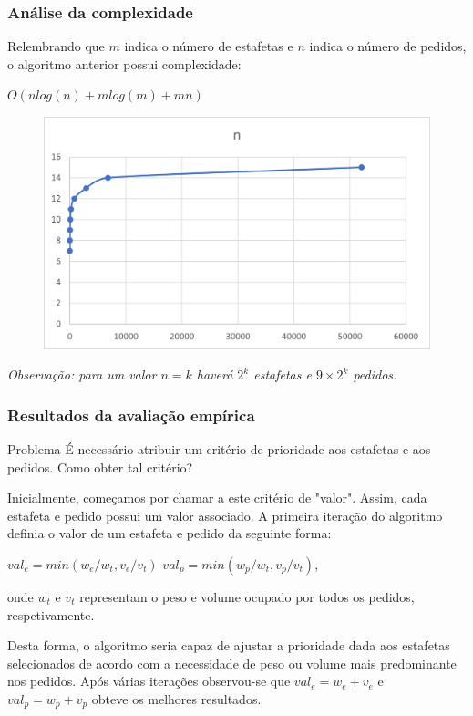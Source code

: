 \documentclass{beamer}
\begin{document}
\begin{frame}
\frametitle{Análise da complexidade}
Relembrando que $m$ indica o número de estafetas e $n$ indica o número de pedidos, o algoritmo anterior
possui complexidade:\\ 
\centerline{$O(nlog(n) + mlog(m) + mn)$}

\begin{figure}
\includegraphics[width=0.5\linewidth]{assets/scenario1.png}
\end{figure}

\textit{Observação: para um valor $n = k$ haverá $2^{k}$ estafetas e $ 9 \times 2^{k}$ pedidos.}

\end{frame}

\begin{frame}
\frametitle{Resultados da avaliação empírica}
\begin{alertblock}{Problema}
É necessário atribuir um critério de prioridade aos estafetas e aos pedidos. Como obter tal critério?
\end{alertblock}

Inicialmente, começamos por chamar a este critério de "valor". Assim, cada estafeta e pedido 
possui um valor associado.
A primeira iteração do algoritmo definia o valor de um estafeta e pedido da seguinte forma:\\
\centerline{$val_{e} = min(w_{e}/w_{t}, v_{e}/v_{t})$      $val_{p} = min(w_{p}/w_{t}, v_{p}/v_{t})$,}

onde $w_{t}$ e $v_{t}$ representam o peso e volume ocupado por todos os pedidos, respetivamente.

Desta forma, o algoritmo seria capaz de ajustar a prioridade dada aos estafetas selecionados de acordo com a necessidade de peso ou volume mais predominante nos pedidos.
Após várias iterações observou-se que $val_{e} = w_{e} + v_{e}$ e $val_{p} = w_{p} + v_{p}$ obteve os melhores resultados.
\end{frame}

\end{document}
